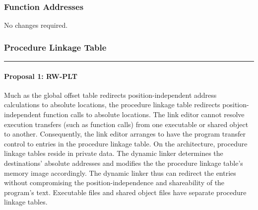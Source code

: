 \subsubsection{Function Addresses}

No changes required.

\subsubsection{Procedure Linkage Table}



\bigskip\hrule

\paragraph{Proposal 1: RW-PLT}


Much as the global offset table redirects position-independent address
calculations to absolute locations, the procedure linkage table
redirects position-independent function calls to absolute locations.
The link editor cannot resolve execution transfers (such as function
calls) from one executable or shared object to another.  Consequently,
the link editor arranges to have the program transfer control to
entries in the procedure linkage table.  On the \xARCH architecture,
procedure linkage tables reside in private data.  The dynamic linker
determines the destinations' absolute addresses and modifies the the
procedure linkage table's memory image accordingly.  The dynamic
linker thus can redirect the entries without compromising the
position-independence and shareability of the program's text.
Executable files and shared object files have separate procedure
linkage tables.

%
%


